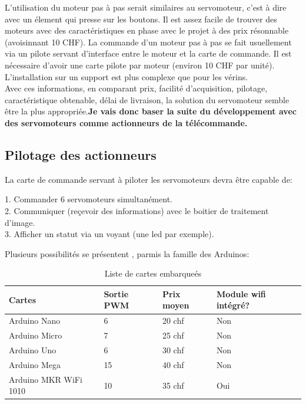 L'utilisation du moteur pas à pas serait similaires au servomoteur, c'est à dire avec un élement qui presse sur les boutons.
Il est assez facile de trouver des moteurs avec des caractéristiques en phase avec le projet à des prix résonnable (avoisinnant 10 CHF). La commande d'un moteur pas à pas
se fait usuellement via un pilote servant d'interface entre le moteur et la carte de commande. Il est nécessaire d'avoir une carte pilote par moteur (environ 10 CHF par unité).
L'installation sur un support est plus complexe que pour les vérins.\\

Avec ces informations, en comparant prix, facilité d'acquisition, pilotage, caractéristique obtenable, délai de livraison, la solution du servomoteur semble être la plus
appropriée.\textbf{Je vais donc baser la suite du développement avec des servomoteurs comme actionneurs de la télécommande.}\\

\subsection{Pilotage des actionneurs}
La carte de commande servant à piloter les servomoteurs devra être capable de:
\begin{listage}
    1. Commander 6 servomoteurs simultanément.\\
    2. Communiquer (reçevoir des informations) avec le boitier de traitement d'image.\\
    3. Afficher un statut via un voyant (une led par exemple).
\end{listage}

Plusieurs possibilités se présentent , parmis la famille des Arduinos:
\begin{table}[H]
    \begin{center}
        \caption{Liste de cartes embarqueés}
        \begin{tabular}{|l|l|l|l|}
            Cartes                & Sortie PWM & Prix moyen   & Module \Gls{wifi} intégré? \\ \hline
            Arduino Nano          & 6          & 20 \Gls{chf} & Non                        \\
            Arduino Micro         & 7          & 25 \Gls{chf} & Non                        \\
            Arduino Uno           & 6          & 30 \Gls{chf} & Non                        \\
            Arduino Mega          & 15         & 40 \Gls{chf} & Non                        \\
            Arduino MKR WiFi 1010 & 10         & 35 \Gls{chf} & Oui
        \end{tabular}
    \end{center}
\end{table}\\

